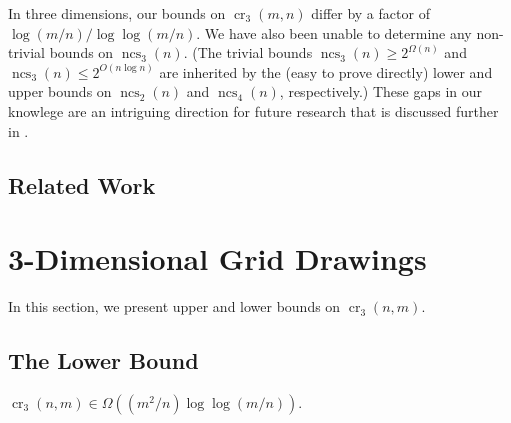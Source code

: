 \documentclass{patmorin}
\DeclareMathOperator{\crs}{cr}
\DeclareMathOperator{\ncs}{ncs}
\begin{document}
In three dimensions, our bounds on $\crs_3(m,n)$ differ by a factor of
$\log(m/n)/\log\log(m/n)$.  We have also been unable to determine any
non-trivial bounds on $\ncs_3(n)$.  (The trivial bounds $\ncs_3(n)\ge
2^{\Omega(n)}$ and $\ncs_3(n)\le 2^{O(n\log n)}$ are inherited by
the (easy to prove directly) lower and upper bounds on $\ncs_2(n)$
and $\ncs_4(n)$, respectively.)  These gaps in our knowlege are an
intriguing direction for future research that is discussed further in
.

\subsection{Related Work}


\section{3-Dimensional Grid Drawings}

In this section, we present upper and lower bounds on $\crs_3(n,m)$.

\subsection{The Lower Bound}

\begin{thm}
  $\crs_3(n,m) \in \Omega((m^2/n)\log\log (m/n))$.
\end{thm}
\end{document}
